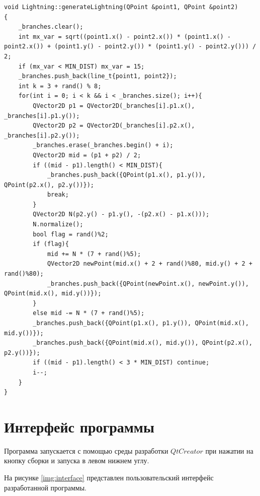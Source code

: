 \clearpage
\begin{lstlisting}[firstnumber=1,caption={Реализация алгоритма генерации молнии}, label=lightning]
void Lightning::generateLightning(QPoint &point1, QPoint &point2)
{
    _branches.clear();
    int mx_var = sqrt((point1.x() - point2.x()) * (point1.x() - point2.x()) + (point1.y() - point2.y()) * (point1.y() - point2.y())) / 2;
    if (mx_var < MIN_DIST) mx_var = 15;
    _branches.push_back(line_t{point1, point2});
    int k = 3 + rand() % 8;
    for(int i = 0; i < k && i < _branches.size(); i++){
        QVector2D p1 = QVector2D(_branches[i].p1.x(), _branches[i].p1.y());
        QVector2D p2 = QVector2D(_branches[i].p2.x(), _branches[i].p2.y());
        _branches.erase(_branches.begin() + i);
        QVector2D mid = (p1 + p2) / 2;
        if ((mid - p1).length() < MIN_DIST){
            _branches.push_back({QPoint(p1.x(), p1.y()), QPoint(p2.x(), p2.y())});
            break;
        }
        QVector2D N(p2.y() - p1.y(), -(p2.x() - p1.x()));
        N.normalize();
        bool flag = rand()%2;
        if (flag){
            mid += N * (7 + rand()%5);
            QVector2D newPoint(mid.x() + 2 + rand()%80, mid.y() + 2 + rand()%80);
            _branches.push_back({QPoint(newPoint.x(), newPoint.y()), QPoint(mid.x(), mid.y())});
        }
        else mid -= N * (7 + rand()%5);
        _branches.push_back({QPoint(p1.x(), p1.y()), QPoint(mid.x(), mid.y())});
        _branches.push_back({QPoint(mid.x(), mid.y()), QPoint(p2.x(), p2.y())});
        if ((mid - p1).length() < 3 * MIN_DIST) continue;
        i--;
    }
}
\end{lstlisting}

\section{Интерфейс программы}

Программа запускается с помощью среды разработки $QtCreator$ при
нажатии на кнопку сборки и запуска в левом нижнем углу.

На рисунке \ref{img:interface} представлен пользовательский интерфейс разработанной программы.

